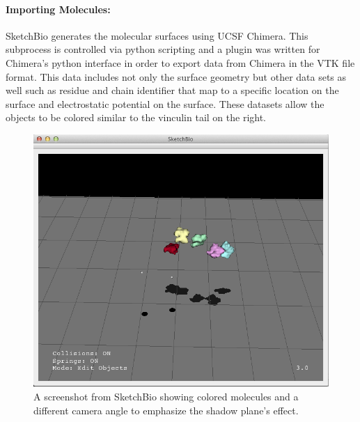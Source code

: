 \documentclass[twocolumn]{bmcart}%
\begin{document}
\paragraph*{Importing Molecules:}
SketchBio generates the molecular surfaces using UCSF Chimera.  This subprocess is controlled via python scripting and a plugin was written for Chimera's python interface in order to export data from Chimera in the VTK file format.  This data includes not only the surface geometry but other data sets as well such as residue and chain identifier that map to a specific location on the surface and electrostatic potential on the surface.  These datasets allow the objects to be colored similar to the vinculin tail on the right.

\begin{figure}[h]
\centering
\includegraphics[width=0.8\columnwidth]{shadow_plane.png}
\caption{A screenshot from SketchBio showing colored molecules and a different camera angle to emphasize the shadow plane's effect.}
\label{fig:shadow_plane}
\end{figure}
\end{document}
